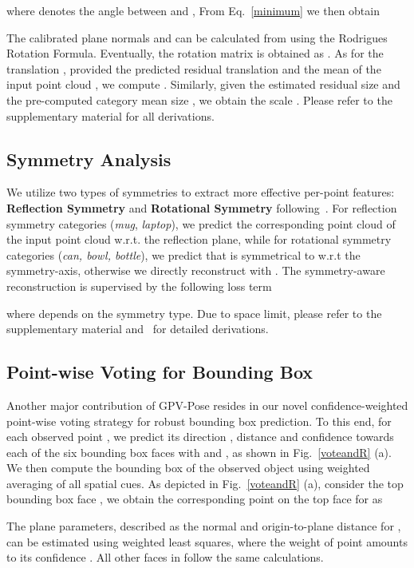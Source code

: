 \documentclass[10pt,twocolumn,letterpaper]{article}
\begin{document}
where  denotes the angle between  and ,
From Eq.~\ref{minimum} we then obtain


\noindent 
The calibrated plane normals  and  can be calculated from  using the Rodrigues Rotation Formula.
Eventually, the rotation matrix is obtained as .
As for the translation , provided the predicted residual translation  and the mean of the input point cloud , we compute .
Similarly, given the estimated residual size  and the pre-computed category mean size , we obtain the scale .
Please refer to the supplementary material for all derivations. 


\subsection{Symmetry Analysis}
We utilize two types of symmetries to extract more effective per-point features: \textbf{Reflection Symmetry} and \textbf{Rotational Symmetry} following~\cite{donet}.
For reflection symmetry categories (\textit{mug}, \textit{laptop}), we predict the corresponding point cloud  of the input point cloud  w.r.t. the reflection plane, while for rotational symmetry categories (\textit{can, bowl, bottle}), we predict  that is symmetrical to   w.r.t the symmetry-axis, otherwise we directly reconstruct  with .
The symmetry-aware reconstruction is supervised by the following loss term

where  depends on the symmetry type.
Due to space limit, please refer to the supplementary material and~\cite{donet} for detailed derivations.




\subsection{Point-wise Voting for Bounding Box}
\label{BBoxVote}
Another major contribution of GPV-Pose resides in our novel confidence-weighted point-wise voting strategy for robust bounding box prediction.
To this end, for each observed point , we predict its direction , distance  and confidence  towards each of the six bounding box faces with  and , as shown in Fig.~\ref{voteandR} (a).
We then compute the bounding box of the observed object using weighted averaging of all spatial cues.
As depicted in Fig.~\ref{voteandR} (a), consider the top bounding box face , we obtain the corresponding point  on the top face  for  as

\noindent The plane parameters, described as the normal  and origin-to-plane distance  for , can be estimated using weighted least squares, where the weight of point  amounts to its confidence . 
All other faces in  follow the same calculations.
\end{document}
